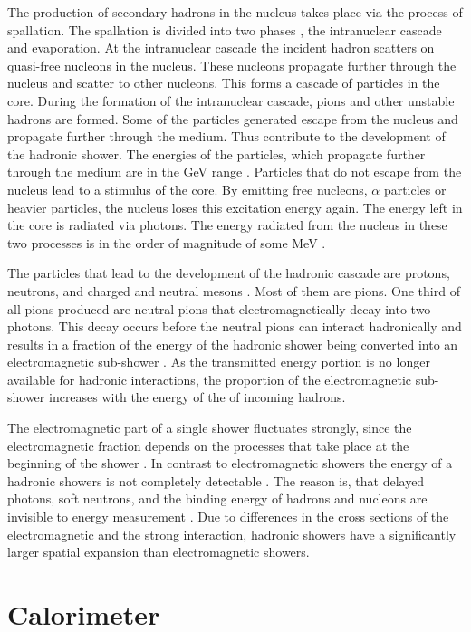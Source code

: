 \documentclass[12pt, a4paper]{thesis}
\begin{document}
The production of secondary hadrons in the nucleus takes place via the
process of spallation. The spallation is divided into two phases
\cite{wigman18}, the intranuclear cascade and evaporation.  At the
intranuclear cascade the incident hadron scatters on quasi-free
nucleons in the nucleus. These nucleons propagate further through the
nucleus and scatter to other nucleons. This forms a cascade of
particles in the core. During the formation of the intranuclear
cascade, pions and other unstable hadrons are formed. Some of the
particles generated escape from the nucleus and propagate further
through the medium. Thus contribute to the development of the hadronic
shower. The energies of the particles, which propagate further through
the medium are in the GeV range \cite{fabjan03}. Particles that do not
escape from the nucleus lead to a stimulus of the core. By emitting
free nucleons, $\alpha$ particles or heavier particles, the nucleus loses
this excitation energy again. The energy left in the core is radiated
via photons. The energy radiated from the nucleus in these two
processes is in the order of magnitude of some MeV \cite{fabjan03}.

The particles that lead to the development of the hadronic cascade are
protons, neutrons, and charged and neutral mesons
\cite{fabjan03}. Most of them are pions. One third of all pions
produced are neutral pions that electromagnetically decay into two
photons. This decay occurs before the neutral pions can interact
hadronically and results in a fraction of the energy of the hadronic
shower being converted into an electromagnetic sub-shower
\cite{fabjan03}. As the transmitted energy portion is no longer
available for hadronic interactions, the proportion of the
electromagnetic sub-shower increases with the energy of the of
incoming hadrons.

The electromagnetic part of a single shower fluctuates strongly, since
the electromagnetic fraction depends on the processes that take place
at the beginning of the shower \cite{wigman18}. In contrast to
electromagnetic showers the energy of a hadronic showers is not
completely detectable \cite{wigman18}. The reason is, that delayed
photons, soft neutrons, and the binding energy of hadrons and nucleons
are invisible to energy measurement \cite{fabjan03}. Due to differences
in the cross sections of the electromagnetic and the strong
interaction, hadronic showers have a significantly larger spatial
expansion than electromagnetic showers\cite{wigman18}.

\section{Calorimeter}
\label{sec:org937122c}
\end{document}
